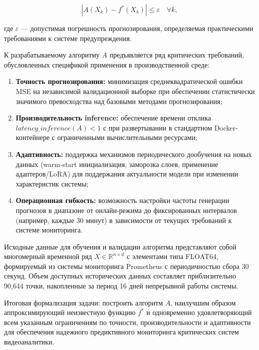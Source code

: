 \begin{equation}
	|A(X_k) - f^*(X_k)| \le \varepsilon \quad \forall k,
\end{equation}

где $\varepsilon$ --- допустимая погрешность прогнозирования, определяемая практическими требованиями к системе предупреждения.

\hspace*{1.25cm}К разрабатываемому алгоритму $A$ предъявляется ряд критических требований, обусловленных спецификой применения в производственной среде:

\begin{enumerate}
	\item \textbf{Точность прогнозирования:} минимизация среднеквадратической ошибки MSE на независимой валидационной выборке при обеспечении статистически значимого превосходства над базовыми методами прогнозирования;
	\item \textbf{Производительность inference:} обеспечение времени отклика \\$latency\_inference(A) < 1$ с при развертывании в стандартном Docker-контейнере с ограниченными вычислительными ресурсами;
	\item \textbf{Адаптивность:} поддержка механизмов периодического дообучения на новых данных (warm-start инициализация, заморозка слоев, применение адаптеров/LoRA) для поддержания актуальности модели при изменении характеристик системы;
	\item \textbf{Операционная гибкость:} возможность настройки частоты генерации прогнозов в диапазоне от онлайн-режима до фиксированных интервалов (например, каждые 30 минут) в зависимости от текущих требований к системе мониторинга.
\end{enumerate}

\hspace*{1.25cm}Исходные данные для обучения и валидации алгоритма представляют собой многомерный временной ряд $X \in \mathbb{R}^{n \times d}$ с элементами типа FLOAT64, формируемый из системы мониторинга Prometheus с периодичностью сбора 30 секунд. Объем доступных исторических данных составляет приблизительно 90,644 точки, накопленные за период 16 дней непрерывной работы системы.

\hspace*{1.25cm}Итоговая формализация задачи: построить алгоритм $A$, наилучшим образом аппроксимирующий неизвестную функцию $f^*$ и одновременно удовлетворяющий всем указанным ограничениям по точности, производительности и адаптивности для обеспечения надежного предиктивного мониторинга критических систем видеоаналитики.

